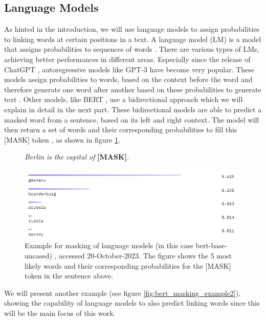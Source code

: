 \subsection{Language Models}
As hinted in the introduction, we will use language models to assign probabilities to linking words at certain positions in a text. A language model (LM) is a model that assigns probabilities to sequences of words \cite{languagemodels2023}. There are various types of LMs, achieving better performances in different areas. Especially since the release of ChatGPT \cite{chatgpt}, autoregressive models like GPT-3 have become very popular. These models assign probabilities to words, based on the context before the word and therefore generate one word after another based on these probabilities to generate text \cite{gpt3}. Other models, like BERT \cite{bert}, use a bidirectional approach which we will explain in detail in the next part. These bidirectional models are able to predict a masked word from a sentence, based on its left and right context. The model will then return a set of words and their corresponding probabilities to fill this [MASK] token \cite{bert}, as shown in figure \ref{fig:bert_masking_example}.

\begin{figure}[H]
  \begin{center}
	\textit{Berlin is the capital of} \textbf{[MASK]}.
  \end{center}
  \centering
  \includegraphics[scale=0.9]{fig/bert_masking_example.png}
  \caption{Example for masking of language models (in this case bert-base-uncased) \cite{bertbaseuncased}, accessed 20-October-2023. The figure shows the 5 most likely words and their corresponding probabilities for the [MASK] token in the sentence above.}%
  \label{fig:bert_masking_example}
\end{figure}

We will present another example (see figure \ref{fig:bert_masking_example2}), showing the capability of language models to also predict linking words since this will be the main focus of this work.

